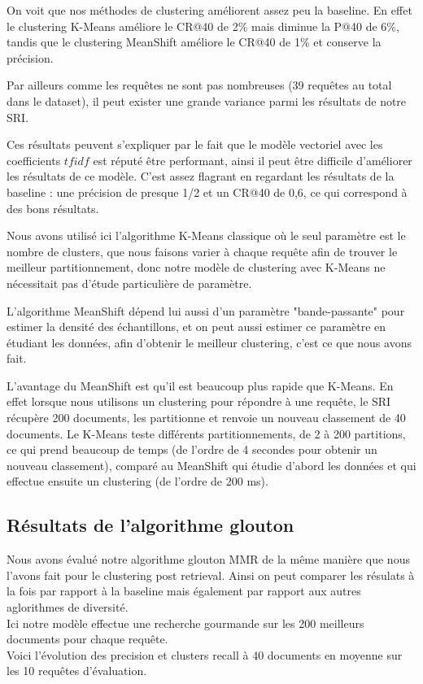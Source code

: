 \documentclass{article}
\begin{document}
On voit que nos méthodes de clustering améliorent assez peu la baseline. En effet le clustering K-Means améliore le CR@40 de 2\% mais diminue la P@40 de 6\%, tandis que le clustering MeanShift améliore le CR@40 de 1\% et conserve la précision. 

Par ailleurs comme les requêtes ne sont pas nombreuses (39 requêtes au total dans le dataset), il peut exister une grande variance parmi les résultats de notre SRI.

Ces résultats peuvent s'expliquer par le fait que le modèle vectoriel avec les coefficients $tfidf$ est réputé être performant, ainsi il peut être difficile d'améliorer les résultats de ce modèle. C'est assez flagrant en regardant les résultats de la baseline : une précision de presque 1/2 et un CR@40 de 0,6, ce qui correspond à des bons résultats.

Nous avons utilisé ici l'algorithme K-Means classique où le seul paramètre est le nombre de clusters, que nous faisons varier à chaque requête afin de trouver le meilleur partitionnement, donc notre modèle de clustering avec K-Means ne nécessitait pas d'étude particulière de paramètre.

L'algorithme MeanShift dépend lui aussi d'un paramètre "bande-passante" pour estimer la densité des échantillons, et on peut aussi estimer ce paramètre en étudiant les données, afin d'obtenir le meilleur clustering, c'est ce que nous avons fait.

L'avantage du MeanShift est qu'il est beaucoup plus rapide que K-Means. En effet lorsque nous utilisons un clustering pour répondre à une requête, le SRI récupère 200 documents, les partitionne et renvoie un nouveau classement de 40 documents.
Le K-Means teste différents partitionnements, de 2 à 200 partitions, ce qui prend beaucoup de temps (de l'ordre de 4 secondes pour obtenir un nouveau classement), comparé au MeanShift qui étudie d'abord les données et qui effectue ensuite un clustering (de l'ordre de 200 ms).

\subsection{Résultats de l'algorithme glouton}
Nous avons évalué notre algorithme glouton MMR de la même manière que nous l'avons fait pour le clustering post retrieval. Ainsi on peut comparer les résulats à la fois par rapport à la baseline mais également par rapport aux autres aglorithmes de diversité. \\
Ici notre modèle effectue une recherche gourmande sur les 200 meilleurs documents pour chaque requête.\\
Voici l'évolution des precision et clusters recall à 40 documents en moyenne sur les 10 requêtes d'évaluation.
\end{document}
